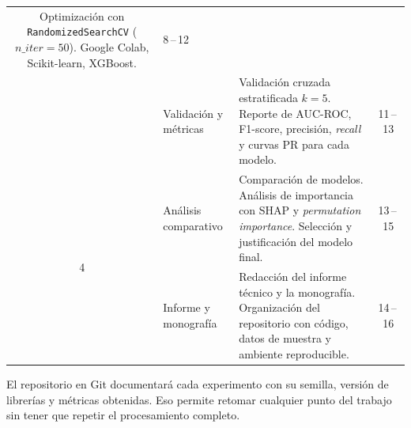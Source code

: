 \begin{table}[H]
\begin{tabularx}{\linewidth}{c l X c}
        Optimización con \texttt{RandomizedSearchCV} ($n\_iter = 50$).
        Google Colab, Scikit-learn, XGBoost.
      & 8\,--\,12 \\
      & Validación y métricas
      & Validación cruzada estratificada $k = 5$. Reporte de AUC-ROC, F1-score,
        precisión, \textit{recall} y curvas PR para cada modelo.
      & 11\,--\,13 \\
    \midrule
    \multirow{2}{*}{4}
      & Análisis comparativo
      & Comparación de modelos. Análisis de importancia con SHAP y
        \textit{permutation importance}. Selección y justificación del modelo final.
      & 13\,--\,15 \\
      & Informe y monografía
      & Redacción del informe técnico y la monografía. Organización del repositorio
        con código, datos de muestra y ambiente reproducible.
      & 14\,--\,16 \\
    \bottomrule
  \end{tabularx}
\end{table}

El repositorio en Git documentará cada experimento con su semilla, versión de
librerías y métricas obtenidas. Eso permite retomar cualquier punto del trabajo
sin tener que repetir el procesamiento completo.